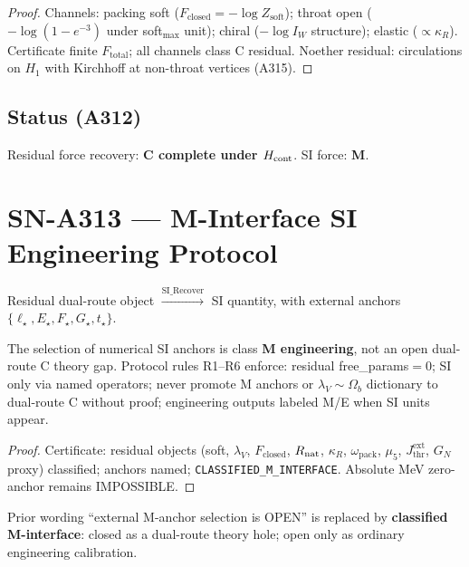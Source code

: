 \begin{proof}
Channels: packing soft ($F_{\mathrm{closed}}=-\log Z_{\mathrm{soft}}$); throat open
($-\log(1-e^{-3})$ under soft$_{\max}$ unit); chiral ($-\log I_W$ structure);
elastic ($\propto\kappa_R$). Certificate finite $F_{\mathrm{total}}$; all channels class C residual.
Noether residual: circulations on $H_1$ with Kirchhoff at non-throat vertices (A315).
\end{proof}

\subsection*{Status (A312)}
Residual force recovery: \textbf{C complete under $H_{\rm cont}$}. SI force: \textbf{M}.

\section{SN-A313 --- M-Interface SI Engineering Protocol}
\label{sec:SN-A313}

\begin{definition}
Residual dual-route object $\xrightarrow{\mathrm{SI\_Recover}}$ SI quantity,
with external anchors $\{\ell_\star,E_\star,F_\star,G_\star,t_\star\}$.
\end{definition}

\begin{theorem}
\label{thm:A313}
The selection of numerical SI anchors is class \textbf{M engineering}, not an open dual-route C theory gap.
Protocol rules R1--R6 enforce: residual free\_params${=}0$; SI only via named operators;
never promote M anchors or $\lambda_V{\sim}\Omega_b$ dictionary to dual-route C without proof;
engineering outputs labeled M/E when SI units appear.
\end{theorem}

\begin{proof}
Certificate: residual objects (soft, $\lambda_V$, $F_{\mathrm{closed}}$, $R_{\rm nat}$, $\kappa_R$,
$\omega_{\mathrm{pack}}$, $\mu_5$, $J_{\mathrm{thr}}^{\mathrm{ext}}$, $G_N$ proxy) classified;
anchors named; \texttt{CLASSIFIED\_M\_INTERFACE}. Absolute MeV zero-anchor remains IMPOSSIBLE.
\end{proof}

\begin{remark}
Prior wording ``external M-anchor selection is OPEN'' is replaced by
\textbf{classified M-interface}: closed as a dual-route theory hole; open only as ordinary engineering calibration.
\end{remark}

